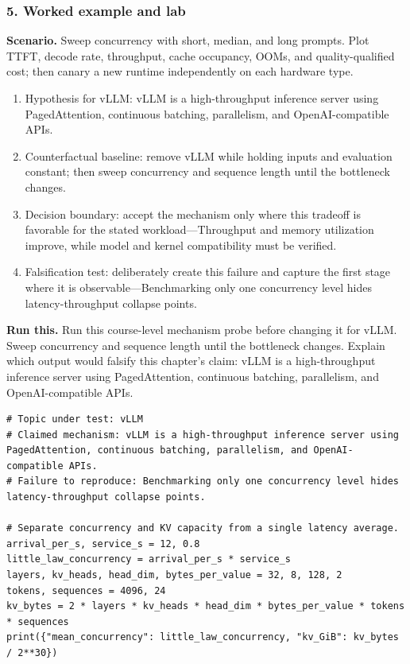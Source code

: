 \subsubsection*{5. Worked example and lab}
\textbf{Scenario.} Sweep concurrency with short, median, and long prompts. Plot TTFT, decode rate, throughput, cache occupancy, OOMs, and quality-qualified cost; then canary a new runtime independently on each hardware type.
\begin{enumerate}
\item Hypothesis for vLLM: vLLM is a high-throughput inference server using PagedAttention, continuous batching, parallelism, and OpenAI-compatible APIs.
\item Counterfactual baseline: remove vLLM while holding inputs and evaluation constant; then sweep concurrency and sequence length until the bottleneck changes.
\item Decision boundary: accept the mechanism only where this tradeoff is favorable for the stated workload—Throughput and memory utilization improve, while model and kernel compatibility must be verified.
\item Falsification test: deliberately create this failure and capture the first stage where it is observable—Benchmarking only one concurrency level hides latency-throughput collapse points.
\end{enumerate}
\textbf{Run this.} Run this course-level mechanism probe before changing it for vLLM. Sweep concurrency and sequence length until the bottleneck changes. Explain which output would falsify this chapter's claim: vLLM is a high-throughput inference server using PagedAttention, continuous batching, parallelism, and OpenAI-compatible APIs.
\begin{Verbatim}[fontsize=\scriptsize]
# Topic under test: vLLM
# Claimed mechanism: vLLM is a high-throughput inference server using PagedAttention, continuous batching, parallelism, and OpenAI-compatible APIs.
# Failure to reproduce: Benchmarking only one concurrency level hides latency-throughput collapse points.

# Separate concurrency and KV capacity from a single latency average.
arrival_per_s, service_s = 12, 0.8
little_law_concurrency = arrival_per_s * service_s
layers, kv_heads, head_dim, bytes_per_value = 32, 8, 128, 2
tokens, sequences = 4096, 24
kv_bytes = 2 * layers * kv_heads * head_dim * bytes_per_value * tokens * sequences
print({"mean_concurrency": little_law_concurrency, "kv_GiB": kv_bytes / 2**30})
\end{Verbatim}
